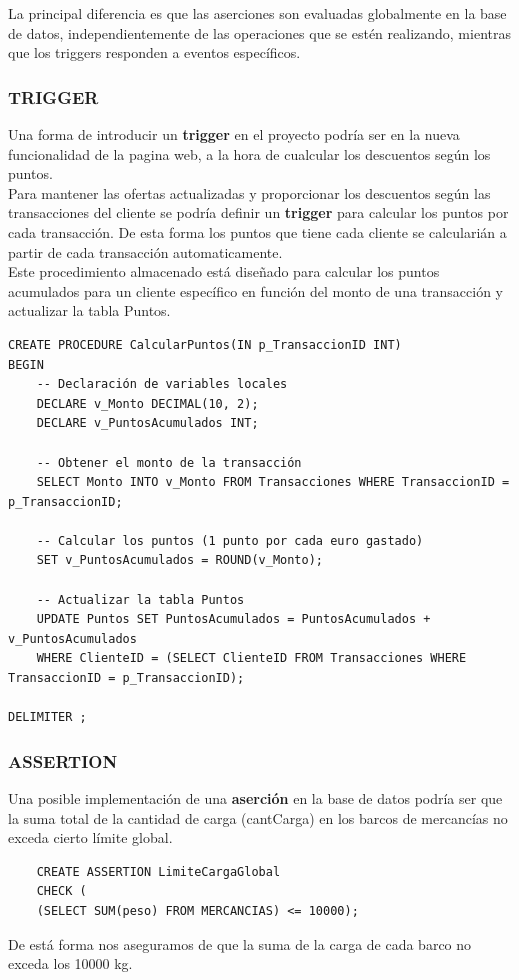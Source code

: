 \documentclass{article}
\begin{document}
La principal diferencia es que las aserciones son evaluadas globalmente en la base de datos, independientemente de las operaciones que se estén realizando, mientras que los triggers responden a eventos específicos.

\subsubsection{TRIGGER}

Una forma de introducir un \textbf{trigger} en el proyecto podría ser en la nueva funcionalidad de la pagina web, a la hora de cualcular los descuentos según los puntos.\\

Para mantener las ofertas actualizadas y proporcionar los descuentos según las transacciones del cliente se podría definir un \textbf{trigger} para calcular los puntos por cada transacción. De esta forma los puntos que tiene cada cliente se calcularián a partir de cada transacción automaticamente.\\

Este procedimiento almacenado está diseñado para calcular los puntos acumulados para un cliente específico en función del monto de una transacción y actualizar la tabla Puntos.

\begin{verbatim}
CREATE PROCEDURE CalcularPuntos(IN p_TransaccionID INT)
BEGIN
    -- Declaración de variables locales
    DECLARE v_Monto DECIMAL(10, 2);
    DECLARE v_PuntosAcumulados INT;

    -- Obtener el monto de la transacción
    SELECT Monto INTO v_Monto FROM Transacciones WHERE TransaccionID = p_TransaccionID;

    -- Calcular los puntos (1 punto por cada euro gastado)
    SET v_PuntosAcumulados = ROUND(v_Monto);

    -- Actualizar la tabla Puntos
    UPDATE Puntos SET PuntosAcumulados = PuntosAcumulados + v_PuntosAcumulados
    WHERE ClienteID = (SELECT ClienteID FROM Transacciones WHERE TransaccionID = p_TransaccionID);

DELIMITER ;
\end{verbatim}

\subsubsection{ASSERTION}

Una posible implementación de una \textbf{aserción} en la base de datos podría ser que la suma total de la cantidad de carga (cantCarga) en los barcos de mercancías no exceda cierto límite global.

\begin{verbatim}
    CREATE ASSERTION LimiteCargaGlobal
    CHECK (
    (SELECT SUM(peso) FROM MERCANCIAS) <= 10000);
\end{verbatim}

De está forma nos aseguramos de que la suma de la carga de cada barco no exceda los 10000 kg.
\end{document}
